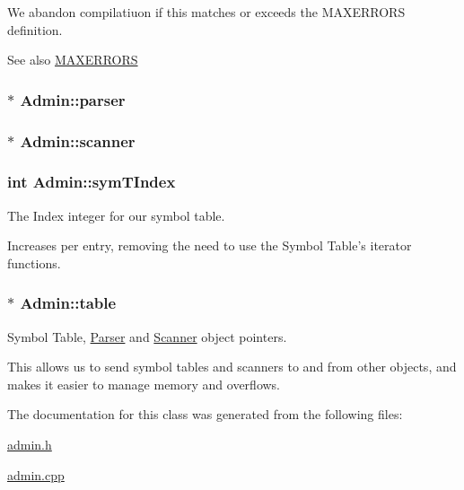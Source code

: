 We abandon compilatiuon if this matches or exceeds the MAXERRORS definition. \begin{DoxySeeAlso}{See also}
\hyperlink{admin_8h_abfea00ff3da8375f9fdd7a6608632e42}{MAXERRORS} 
\end{DoxySeeAlso}
\hypertarget{classAdmin_a0fe59c6a08ae239bee02a58180fef8c3}{
\subsubsection[{parser}]{$\ast$ {\bf Admin::parser}}}
\label{classAdmin_a0fe59c6a08ae239bee02a58180fef8c3}
\hypertarget{classAdmin_a6846c5ec5e565001a18a20167ff7b3cf}{
\subsubsection[{scanner}]{$\ast$ {\bf Admin::scanner}}}
\label{classAdmin_a6846c5ec5e565001a18a20167ff7b3cf}
\hypertarget{classAdmin_ae1c48226f950c3e470785785aff4d536}{
\subsubsection[{symTIndex}]{\setlength{\rightskip}{0pt plus 5cm}int {\bf Admin::symTIndex}}}
\label{classAdmin_ae1c48226f950c3e470785785aff4d536}


The Index integer for our symbol table. 

Increases per entry, removing the need to use the Symbol Table's iterator functions. \hypertarget{classAdmin_afb5161f047f166b985257447b9c47f22}{
\subsubsection[{table}]{$\ast$ {\bf Admin::table}}}
\label{classAdmin_afb5161f047f166b985257447b9c47f22}


Symbol Table, \hyperlink{classParser}{Parser} and \hyperlink{classScanner}{Scanner} object pointers. 

This allows us to send symbol tables and scanners to and from other objects, and makes it easier to manage memory and overflows. 

The documentation for this class was generated from the following files:\begin{DoxyCompactItemize}
\item 
\hyperlink{admin_8h}{admin.h}\item 
\hyperlink{admin_8cpp}{admin.cpp}\end{DoxyCompactItemize}
